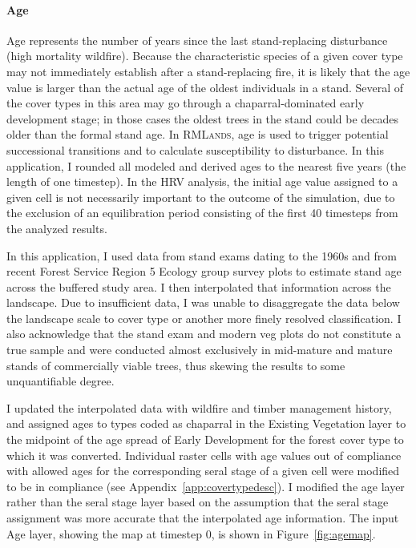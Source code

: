 \paragraph*{Age}
Age represents the number of years since the last stand-replacing disturbance (high mortality wildfire). Because the characteristic species of a given cover type may not immediately establish after a stand-replacing fire, it is likely that the age value is larger than the actual age of the oldest individuals in a stand. Several of the cover types in this area may go through a chaparral-dominated early development stage; in those cases the oldest trees in the stand could be decades older than the formal stand age. In \textsc{RMLands}, age is used to trigger potential successional transitions and to calculate susceptibility to disturbance. In this application, I rounded all modeled and derived ages to the nearest five years (the length of one timestep). In the HRV analysis, the initial age value assigned to a given cell is not necessarily important to the outcome of the simulation, due to the exclusion of an equilibration period consisting of the first 40 timesteps from the analyzed results.

In this application, I used data from stand exams dating to the 1960s and from recent Forest Service Region 5 Ecology group survey plots to estimate stand age across the buffered study area. I then interpolated that information across the landscape. Due to insufficient data, I was unable to disaggregate the data below the landscape scale to cover type or another more finely resolved classification. I also acknowledge that the stand exam and modern veg plots do not constitute a true sample and were conducted almost exclusively in mid-mature and mature stands of commercially viable trees, thus skewing the results to some unquantifiable degree.

I updated the interpolated data with wildfire and timber management history, and assigned ages to types coded as chaparral in the Existing Vegetation layer to the midpoint of the age spread of Early Development for the forest cover type to which it was converted. Individual raster cells with age values out of compliance with allowed ages for the corresponding seral stage of a given cell were modified to be in compliance (see Appendix~\ref{app:covertypedesc}). I modified the age layer rather than the seral stage layer based on the assumption that the seral stage assignment was more accurate that the interpolated age information. The input Age layer, showing the map at timestep 0, is shown in Figure~\ref{fig:agemap}.


